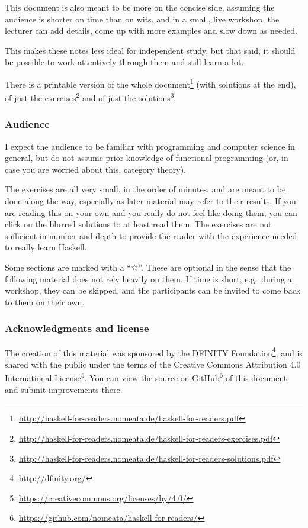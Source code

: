\documentclass[11pt,
  american,
  DIV13]{article}
\DeclareRobustCommand{\href}[2]{#2\footnote{\url{#1}}}
\begin{document}
This document is also meant to be more on the concise side, assuming the
audience is shorter on time than on wits, and in a small, live workshop,
the lecturer can add details, come up with more examples and slow down
as needed.

This makes these notes less ideal for independent study, but that said,
it should be possible to work attentively through them and still learn a
lot.

There is a printable version of
\href{http://haskell-for-readers.nomeata.de/haskell-for-readers.pdf}{the
whole document} (with solutions at the end), of
\href{http://haskell-for-readers.nomeata.de/haskell-for-readers-exercises.pdf}{just
the exercises} and of
\href{http://haskell-for-readers.nomeata.de/haskell-for-readers-solutions.pdf}{just
the solutions}.

\hypertarget{audience}{%
\subsubsection*{Audience}\label{audience}}

I expect the audience to be familiar with programming and computer
science in general, but do not assume prior knowledge of functional
programming (or, in case you are worried about this, category theory).

The exercises are all very small, in the order of minutes, and are meant
to be done along the way, especially as later material may refer to
their results. If you are reading this on your own and you really do not
feel like doing them, you can click on the blurred solutions to at least
read them. The exercises are not sufficient in number and depth to
provide the reader with the experience needed to really learn Haskell.

Some sections are marked with a ``☆''. These are optional in the sense
that the following material does not rely heavily on them. If time is
short, e.g.~during a workshop, they can be skipped, and the participants
can be invited to come back to them on their own.

\hypertarget{acknowledgments-and-license}{%
\subsubsection*{Acknowledgments and
license}\label{acknowledgments-and-license}}

The creation of this material was sponsored by the
\href{http://dfinity.org/}{DFINITY Foundation}, and is shared with the
public under the terms of the
\href{https://creativecommons.org/licenses/by/4.0/}{Creative Commons
Attribution 4.0 International License}. You can view
\href{https://github.com/nomeata/haskell-for-readers/}{the source on
GitHub} of this document, and submit improvements there.
\end{document}
